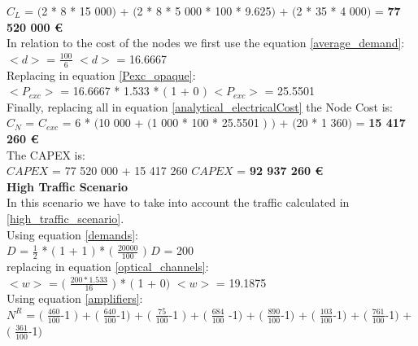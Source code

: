 $C_L$ = $($2 * 8 * 15 000$)$ + $($2 * 8 * 5 000 * 100 * 9.625$)$ + $($2 * 35 * 4 000$)$ = \textbf{77 520 000 \euro}\\

In relation to the cost of the nodes we first use the equation \ref{average_demand}:\\

$<d>$ = $\frac{100}{6}$ \qquad \qquad $<d>$ = 16.6667\\

Replacing in equation \ref{Pexc_opaque}:\\

$<P_{exc}>$ = 16.6667 * 1.533 * $($ 1 + 0 $)$ \qquad \qquad $<P_{exc}>$ = 25.5501 \\

Finally, replacing all in equation \ref{analytical_electricalCost} the Node Cost is:\\

$C_N$ = $C_{exc}$ = 6 * $($10 000 + $($1 000 * 100 * 25.5501 $)$ $)$ + $($20 * 1 360$)$ = \textbf{15 417 260 \euro}\\

The CAPEX is:\\

$CAPEX$ = 77 520 000 + 15 417 260 \qquad \qquad $CAPEX$ = \textbf{92 937 260 \euro}\\

\textbf{High Traffic Scenario}\\

In this scenario we have to take into account the traffic calculated in \ref{high_traffic_scenario}.\\

Using equation \ref{demands}:\\

$D$ = $\frac{1}{2}$ * $($ 1 + 1 $)$ * $($ $\frac{20 000}{100}$ $)$ \qquad \qquad $D$ = 200\\

replacing in equation \ref{optical_channels}:\\

$<w>$ = $($ $\frac{200 * 1.533}{16}$ $)$ * $($ 1 + 0$)$ \qquad \quad $<w>$ = 19.1875\\

Using equation \ref{amplifiers}:\\

$N^R$ = $($ $\frac{460}{100}$-1 $)$ + $($ $\frac{640}{100}$-1$)$ + $($ $\frac{75}{100}$-1 $)$ + $($ $\frac{684}{100}$ -1$)$ + $($ $\frac{890}{100}$-1$)$ + $($ $\frac{103}{100}$-1$)$ + $($ $\frac{761}{100}$-1$)$ + $($ $\frac{361}{100}$-1$)$\\

